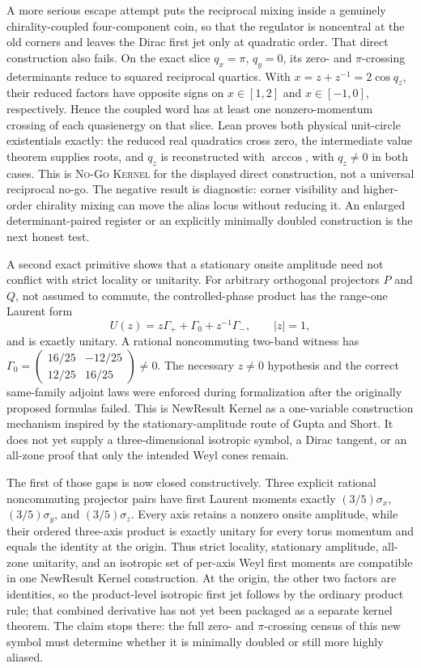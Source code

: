 \documentclass[11pt]{article}
\newcommand{\Kernel}{\textcolor{kernelcolor}{\textsc{Kernel}}}
\newcommand{\NoGo}{\textsc{No-Go}}
\begin{document}
A more serious escape attempt puts the reciprocal mixing inside a genuinely
chirality-coupled four-component coin, so that the regulator is noncentral at
the old corners and leaves the Dirac first jet only at quadratic order.  That
direct construction also fails.  On the exact slice $q_x=\pi$, $q_y=0$, its
zero- and $\pi$-crossing determinants reduce to squared reciprocal quartics.
With $x=z+z^{-1}=2\cos q_z$, their reduced factors have opposite signs on
$x\in[1,2]$ and $x\in[-1,0]$, respectively.  Hence the coupled word has at
least one nonzero-momentum crossing of each quasienergy on that slice.  Lean proves
both physical unit-circle existentials exactly: the reduced real quadratics
cross zero, the intermediate value theorem supplies roots, and $q_z$ is
reconstructed with $\arccos$, with $q_z\ne0$ in both cases.  This is
\NoGo{} \Kernel{} for the displayed direct construction, not a universal
reciprocal no-go.  The negative result is diagnostic: corner visibility and
higher-order chirality mixing can move the alias locus without reducing it.
An enlarged determinant-paired register or an explicitly minimally doubled
construction is the next honest test.

A second exact primitive shows that a stationary onsite amplitude need not
conflict with strict locality or unitarity.  For arbitrary orthogonal
projectors $P$ and $Q$, not assumed to commute, the controlled-phase product
has the range-one Laurent form
\[
 U(z)=z\Gamma_+ + \Gamma_0 + z^{-1}\Gamma_-,
 \qquad |z|=1,
\]
and is exactly unitary.  A rational noncommuting two-band witness has
$\Gamma_0=\left(\begin{smallmatrix}16/25&-12/25\\12/25&16/25\end{smallmatrix}\right)
\ne0$.  The necessary $z\ne0$ hypothesis and the correct same-family adjoint
laws were enforced during formalization after the originally proposed formulas
failed.  This is NewResult{} Kernel{} as a one-variable construction
mechanism inspired by the stationary-amplitude route of Gupta and Short.  It
does not yet supply a three-dimensional isotropic symbol, a Dirac tangent, or
an all-zone proof that only the intended Weyl cones remain.

The first of those gaps is now closed constructively.  Three explicit rational
noncommuting projector pairs have first Laurent moments exactly
$(3/5)\sigma_x$, $(3/5)\sigma_y$, and $(3/5)\sigma_z$.  Every axis retains a
nonzero onsite amplitude, while their ordered three-axis product is exactly
unitary for every torus momentum and equals the identity at the origin.  Thus
strict locality, stationary amplitude, all-zone unitarity, and an isotropic
set of per-axis Weyl first moments are compatible in one NewResult{} Kernel{}
construction.  At the origin, the other two factors are identities, so the
product-level isotropic first jet follows by the ordinary product rule; that
combined derivative has not yet been packaged as a separate kernel theorem.
The claim stops there: the full zero- and $\pi$-crossing census of this new
symbol must determine whether it is minimally doubled or still more highly
aliased.
\end{document}
